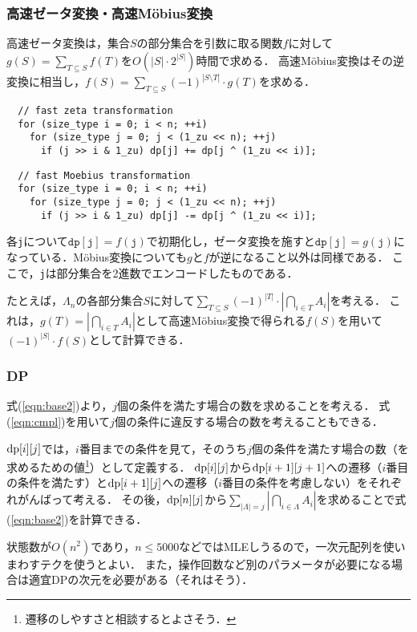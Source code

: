 \documentclass{jsarticle}
\newcommand{\DP}{\ensuremath\mathrm{dp}}
\begin{document}
\subsubsection{高速ゼータ変換・高速M\"obius変換}
高速ゼータ変換は，集合$S$の部分集合を引数に取る関数$f$に対して$g(S)=\sum_{T\subseteq S} f(T)$を$O(|S|\cdot 2^{|S|})$時間で求める．
高速M\"obius変換はその逆変換に相当し，$f(S)=\sum_{T\subseteq S} (-1)^{|S\setminus T|}\cdot g(T)$を求める．
\begin{verbatim}
  // fast zeta transformation
  for (size_type i = 0; i < n; ++i)
    for (size_type j = 0; j < (1_zu << n); ++j)
      if (j >> i & 1_zu) dp[j] += dp[j ^ (1_zu << i)];
\end{verbatim}
\begin{verbatim}
  // fast Moebius transformation
  for (size_type i = 0; i < n; ++i)
    for (size_type j = 0; j < (1_zu << n); ++j)
      if (j >> i & 1_zu) dp[j] -= dp[j ^ (1_zu << i)];
\end{verbatim}
各\texttt{j}について$\mathtt{dp}[\mathtt{j}] = f(\mathtt{j})$で初期化し，ゼータ変換を施すと$\mathtt{dp}[\mathtt{j}] = g(\mathtt{j})$になっている．M\"obius変換についても$g$と$f$が逆になること以外は同様である．
ここで，\texttt{j}は部分集合を2進数でエンコードしたものである．

たとえば，$\Lambda_n$の各部分集合$S$に対して$\sum_{T\subseteq S} (-1)^{|T|}\cdot \left|\bigcap_{i\in T}A_i\right|$を考える．
これは，$g(T) = \left|\bigcap_{i\in T} A_i\right|$として高速M\"obius変換で得られる$f(S)$を用いて$(-1)^{|S|}\cdot f(S)$として計算できる．

\subsubsection{DP}
式(\ref{eqn:base2})より，$j$個の条件を満たす場合の数を求めることを考える．
式(\ref{eqn:cmpl})を用いて$j$個の条件に違反する場合の数を考えることもできる．

$\DP[i][j]$では，$i$番目までの条件を見て，そのうち$j$個の条件を満たす場合の数（を求めるための値\footnote{遷移のしやすさと相談するとよさそう．}）として定義する．
$\DP[i][j]$から$\DP[i+1][j+1]$への遷移（$i$番目の条件を満たす）と$\DP[i+1][j]$への遷移（$i$番目の条件を考慮しない）をそれぞれがんばって考える．
その後，$\DP[n][j]$から$\sum_{|\Lambda|=j}\left|\bigcap_{i\in\Lambda} A_i\right|$を求めることで式(\ref{eqn:base2})を計算できる．

状態数が$O(n^2)$であり，$n\le 5000$などではMLEしうるので，一次元配列を使いまわすテクを使うとよい．
また，操作回数など別のパラメータが必要になる場合は適宜DPの次元を必要がある（それはそう）．
\end{document}
